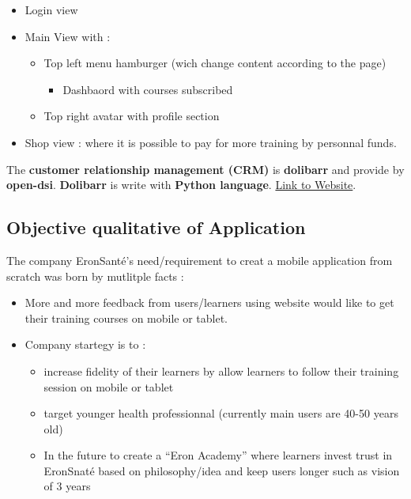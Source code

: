 \documentclass[
  12pt,
]{article}
\providecommand{\tightlist}{%
  \setlength{\itemsep}{0pt}\setlength{\parskip}{0pt}}
\begin{document}
\begin{itemize}
\tightlist
\item
  Login view
\item
  Main View with :

  \begin{itemize}
  \tightlist
  \item
    Top left menu hamburger (wich change content according to the page)

    \begin{itemize}
    \tightlist
    \item
      Dashbaord with courses subscribed
    \end{itemize}
  \item
    Top right avatar with profile section
  \end{itemize}
\item
  Shop view : where it is possible to pay for more training by personnal
  funds.
\end{itemize}

The \textbf{customer relationship management (CRM)} is \textbf{dolibarr}
and provide by \textbf{open-dsi}. \textbf{Dolibarr} is write with
\textbf{Python language}.
\href{https://eron-dlb.open-dsi.fr/doliprod/index.php?mainmenu=home}{Link
to Website}.

\hypertarget{objective-qualitative-of-application}{%
\subsection{Objective qualitative of
Application}\label{objective-qualitative-of-application}}

The company EronSanté's need/requirement to creat a mobile application
from scratch was born by mutlitple facts :

\begin{itemize}
\tightlist
\item
  More and more feedback from users/learners using website would like to
  get their training courses on mobile or tablet.
\item
  Company startegy is to :

  \begin{itemize}
  \tightlist
  \item
    increase fidelity of their learners by allow learners to follow
    their training session on mobile or tablet
  \item
    target younger health professionnal (currently main users are 40-50
    years old)
  \item
    In the future to create a ``Eron Academy'' where learners invest
    trust in EronSnaté based on philosophy/idea and keep users longer
    such as vision of 3 years
  \end{itemize}
\end{itemize}
\end{document}
